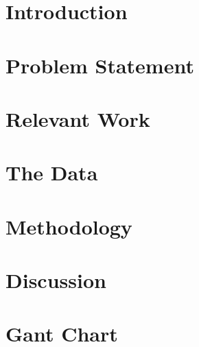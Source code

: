 \documentclass[12pt,arial,a4paper]{article}
\begin{document}
\tableofcontents
{}
\newpage
\setcounter{page}{1}

\section{Introduction}




\section{Problem Statement}




\section{Relevant Work}




\section{The Data}



\section{Methodology}




\section{Discussion}




\section{Gant Chart}










\end{document}
